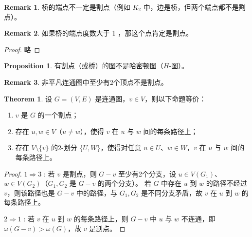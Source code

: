 \documentclass[oneside]{book}
\theoremstyle{definition}
\newtheorem{proposition}{Proposition}[section]
\newtheorem{theorem}{Theorem}[section]
\newtheorem{remark}{Remark}[section]
\begin{document}
\begin{remark}
	桥的端点不一定是割点（例如 \( K_{2} \) 中，边是桥，但两个端点都不是割点）。
\end{remark}
\begin{remark}
	如果桥的端点度数大于 1 ，那这个点肯定是割点。
\end{remark}
\begin{proof}
	略
\end{proof}
\begin{proposition}
	有割点（或桥）的图不是哈密顿图（\( H \)-图）。
\end{proposition}

\begin{remark}
	非平凡连通图中至少有2个顶点不是割点。
\end{remark}

\begin{theorem}
	设 \( G=(V,E) \) 是连通图，\( v \in V \)，则以下命题等价：
	\begin{enumerate}
		\item \( v \) 是 \( G \) 的一个割点；
		\item 存在 \( u,w \in V \)（\( u \neq w \)），使得 \( v \) 在 \( u \) 与 \( w \) 间的每条路径上；
		\item 存在 \( V\setminus\{v\} \) 的2-划分 \( \{U,W\} \)，使得对任意 \( u \in U \)、\( w \in W \)，\( v \) 在 \( u \) 与 \( w \) 间的每条路径上。
	\end{enumerate}
\end{theorem}




\begin{proof}
	\(1\Rightarrow 3\) : 若 \( v \) 是割点，则 \( G-v \) 至少有2个分支，设 \( u \in V(G_1) \)、\( w \in V(G_2) \)（\( G_1,G_2 \) 是 \( G-v \) 的两个分支）。
	若 \( G \) 中存在 \( u \) 到 \( w \) 的路径不经过 \( v \)，则该路径也是 \( G-v \) 中的路径，与 \( G_1,G_2 \) 是不同分支矛盾，故 \( v \) 在 \( u \) 到 \( w \) 的每条路径上。
	
	\(2\Rightarrow 1\) : 若 \( v \) 在 \( u \) 到 \( w \) 的每条路径上，则 \( G-v \) 中 \( u \) 与 \( w \) 不连通，即 \( \omega(G-v) > \omega(G) \)，故 \( v \) 是割点。
\end{proof}
\end{document}
